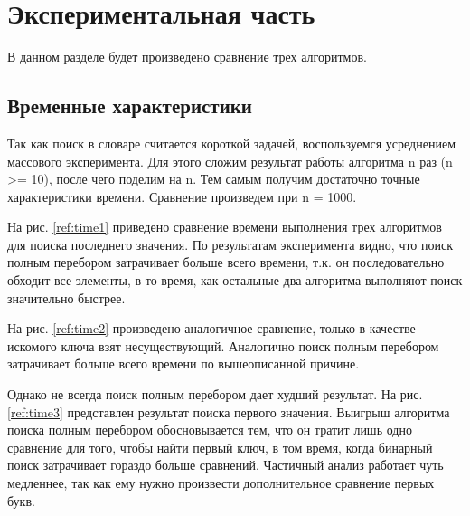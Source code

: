 \chapter{Экспериментальная часть}

В данном разделе будет произведено сравнение трех алгоритмов.

\section{Временные характеристики}

Так как поиск в словаре считается короткой задачей, воспользуемся усреднением массо­вого эксперимента.
Для этого сложим результат работы алгоритма n раз (n >= 10), после чего поделим на n.
Тем самым получим достаточно точные характеристики времени.
Сравнение произведем при n = 1000.

На рис. \ref{ref:time1} приведено сравнение времени выполнения
трех алгоритмов для поиска последнего значения.
По результатам эксперимента видно, что поиск полным перебором
затрачивает больше всего времени, т.к. он последовательно обходит
все элементы, в то время, как остальные два алгоритма выполняют
поиск значительно быстрее.

\begin{figure}[ht!]
\end{figure}

На рис. \ref{ref:time2} произведено аналогичное сравнение, только в качестве искомого ключа
взят несуществующий. Аналогично поиск полным перебором
затрачивает больше всего времени по вышеописанной причине.

\begin{figure}[ht!]
\end{figure}

Однако не всегда поиск полным перебором дает худший результат.
На рис. \ref{ref:time3} представлен результат поиска первого значения.
Выигрыш алгоритма поиска полным перебором обосновывается тем, что он тратит
лишь одно сравнение для того, чтобы найти первый ключ, в том время, когда
бинарный поиск затрачивает гораздо больше сравнений.
Частичный анализ работает чуть медленнее, так как ему нужно
произвести дополнительное сравнение первых букв.

\begin{figure}[ht!]
\end{figure}

